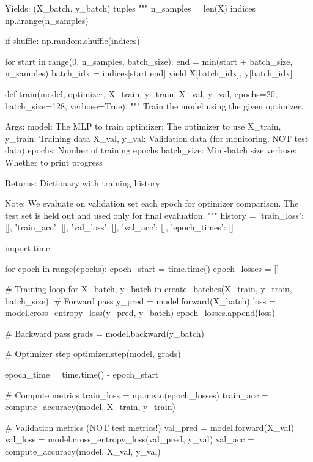 \documentclass[../../main.tex]{subfiles}
\begin{document}
\begin{pythoncode}
    Yields:
        (X_batch, y_batch) tuples
    """
    n_samples = len(X)
    indices = np.arange(n_samples)

    if shuffle:
        np.random.shuffle(indices)

    for start in range(0, n_samples, batch_size):
        end = min(start + batch_size, n_samples)
        batch_idx = indices[start:end]
        yield X[batch_idx], y[batch_idx]


def train(model, optimizer, X_train, y_train, X_val, y_val,
          epochs=20, batch_size=128, verbose=True):
    """
    Train the model using the given optimizer.

    Args:
        model: The MLP to train
        optimizer: The optimizer to use
        X_train, y_train: Training data
        X_val, y_val: Validation data (for monitoring, NOT test data)
        epochs: Number of training epochs
        batch_size: Mini-batch size
        verbose: Whether to print progress

    Returns:
        Dictionary with training history

    Note: We evaluate on validation set each epoch for optimizer comparison.
          The test set is held out and used only for final evaluation.
    """
    history = {
        'train_loss': [],
        'train_acc': [],
        'val_loss': [],
        'val_acc': [],
        'epoch_times': []
    }

    import time

    for epoch in range(epochs):
        epoch_start = time.time()
        epoch_losses = []

        # Training loop
        for X_batch, y_batch in create_batches(X_train, y_train, batch_size):
            # Forward pass
            y_pred = model.forward(X_batch)
            loss = model.cross_entropy_loss(y_pred, y_batch)
            epoch_losses.append(loss)

            # Backward pass
            grads = model.backward(y_batch)

            # Optimizer step
            optimizer.step(model, grads)

        epoch_time = time.time() - epoch_start

        # Compute metrics
        train_loss = np.mean(epoch_losses)
        train_acc = compute_accuracy(model, X_train, y_train)

        # Validation metrics (NOT test metrics!)
        val_pred = model.forward(X_val)
        val_loss = model.cross_entropy_loss(val_pred, y_val)
        val_acc = compute_accuracy(model, X_val, y_val)


\end{pythoncode}
\end{document}
